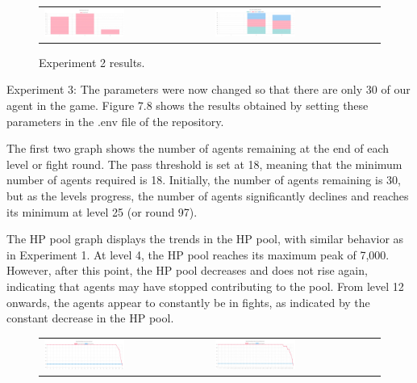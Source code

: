 \begin{figure}[htbp]
\begin{tabular}{ll}
    \centering
    \includegraphics[width=0.5\textwidth]{007_team_4_agent_design/figures/EX2_3.jpg}
    &
    \includegraphics[width=0.5\textwidth]{007_team_4_agent_design/figures/EX2_4.jpg}
\end{tabular}
    \caption{Experiment 2 results.}
\end{figure}


\newpage

Experiment 3: The parameters were now changed so that there are only 30 of our agent in the game. Figure 7.8 shows the results obtained by setting these parameters in the .env file of the repository. 

\par The first two graph shows the number of agents remaining at the end of each level or fight round. The pass threshold is set at 18, meaning that the minimum number of agents required is 18. Initially, the number of agents remaining is 30, but as the levels progress, the number of agents significantly declines and reaches its minimum at level 25 (or round 97).

The HP pool graph displays the trends in the HP pool, with similar behavior as in Experiment 1. At level 4, the HP pool reaches its maximum peak of 7,000. However, after this point, the HP pool decreases and does not rise again, indicating that agents may have stopped contributing to the pool. From level 12 onwards, the agents appear to constantly be in fights, as indicated by the constant decrease in the HP pool.


\begin{figure}[htbp]
\begin{tabular}{ll}
    \centering
    \includegraphics[width=0.5\textwidth]{007_team_4_agent_design/figures/EX3_1.jpg}
    &
    \includegraphics[width=0.5\textwidth]{007_team_4_agent_design/figures/EX3_2.jpg}
\end{tabular}

\end{figure}

